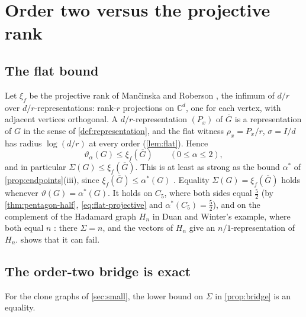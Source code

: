 \documentclass[11pt]{article}
\newtheorem{proposition}[theorem]{Proposition}
\theoremstyle{definition}
\newcommand{\vt}{\vartheta}
\begin{document}
\section{Order two versus the projective rank}\label{sec:projective}

\subsection{The flat bound}

Let $\xi_f$ be the projective rank of Man\v{c}inska and Roberson
\cite{MancinskaRoberson2016}, the infimum of $d/r$ over
$d/r$-representations: rank-$r$ projections on $\mathbb C^d$, one for each
vertex, with adjacent vertices orthogonal.  A $d/r$-representation $(P_x)$ of
$\overline G$ is a representation of $G$ in the sense of
\cref{def:representation}, and the flat witness $\rho_x=P_x/r$,
$\sigma=I/d$ has radius $\log(d/r)$ at every order (\cref{lem:flat}).
Hence
\begin{equation}\label{eq:flat-projective}
 \vt_\alpha(G)\le\xi_f(\overline G)\qquad(0\le\alpha\le2),
\end{equation}
and in particular $\Sigma(G)\le\xi_f(\overline G)$.  This is at least as strong as
the bound $\alpha^*$ of \cref{prop:endpoints}(iii), since
$\xi_f(\overline G)\le\alpha^*(G)$ \cite{LiZuiddam2020}.  Equality
$\Sigma(G)=\xi_f(\overline G)$ holds whenever $\vt(G)=\alpha^*(G)$.  It
holds on $C_5$, where both sides equal $\frac52$ (by
\cref{thm:pentagon-half}, \eqref{eq:flat-projective} and
$\alpha^*(C_5)=\frac52$), and on the complement of the Hadamard graph $H_n$
in Duan and Winter's example, where both equal $n$
\cite[Section~V]{DuanWinter2016}: there $\Sigma=n$, and the vectors of $H_n$
give an $n/1$-representation of $H_n$.   shows that it can fail.

\subsection{The order-two bridge is exact}

For the clone graphs of \cref{sec:small}, the lower bound on $\Sigma$ in
\cref{prop:bridge} is an equality.

\end{document}
